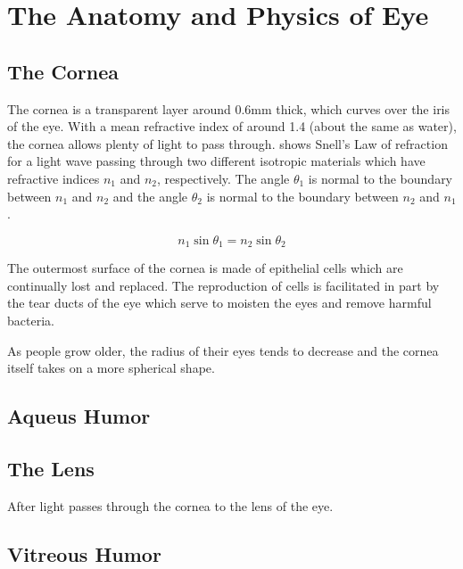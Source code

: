 
\chapter{The Anatomy and Physics of Eye}

\label{anatomy} %


\section{The Cornea}

The cornea is a transparent layer around 0.6mm thick, which curves over the
iris of the eye.\cite{yaylali1997corneal,thoft1983x,patel1994refractive}
With a mean refractive index of around 1.4 (about the same as water),
the cornea allows plenty of light to pass through. 
shows Snell's Law of refraction for a light wave passing through two
different isotropic materials which have refractive indices $n_1$ and $n_2$,
respectively. The angle $\theta_1$ is normal to the boundary between $n_1$
and $n_2$ and the angle $\theta_2$ is normal to the boundary between $n_2$
and $n_1$.

\begin{equation}
n_1\sin\theta_1=n_2\sin\theta_2
\label{eq:refractive}
\end{equation}


The outermost surface of the cornea is made of epithelial cells which
are continually lost and replaced.\cite{jester1999cellular,hassell2010molecular}
The reproduction of cells is facilitated in part by the tear ducts of
the eye which  serve to moisten the eyes and remove harmful bacteria.\cite{holly1977tear}

As people grow older, the radius of their eyes tends to decrease and
the cornea itself takes on a more spherical shape.\cite{guirao2000optical}

\section{Aqueus Humor}

\section{The Lens}
After light passes through the cornea to the lens of the eye.

\section{Vitreous Humor}


